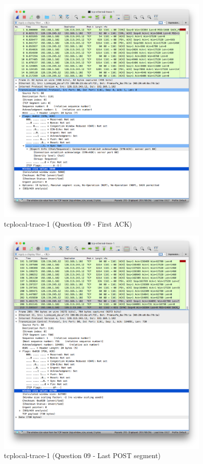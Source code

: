 \documentclass[11pt]{article}
\begin{document}
\begin{itemize}
		\begin{figure}[H]
		\centering
		\caption{tcplocal-trace-1 (Question 09 - First ACK)}
		\includegraphics[width=400px]{08}
		\end{figure}
		
		\begin{figure}[H]
		\centering
		\caption{tcplocal-trace-1 (Question 09 - Last POST segment)}
		\includegraphics[width=400px]{09}
		\end{figure}


\end{itemize}
\end{document}
